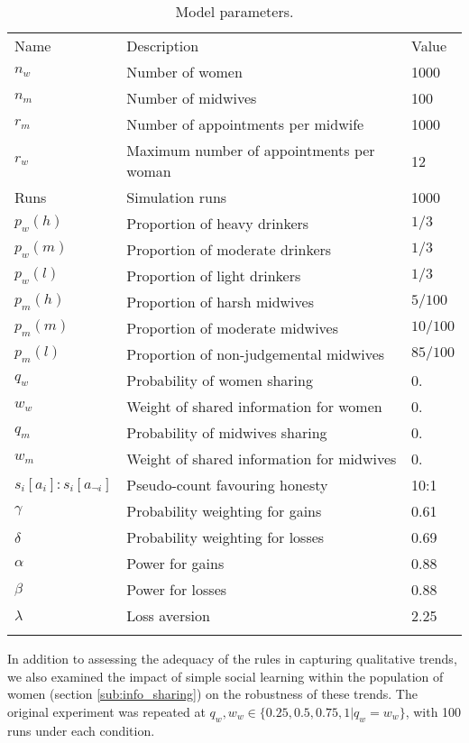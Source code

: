 \begin{table}[h!]
\caption{Model parameters.} 
\label{tab:qt_params}
\begin{tabular} {lll}
\hline\noalign{\smallskip}
Name & Description & Value \\
\noalign{\smallskip}\svhline\noalign{\smallskip}
\(n_{w}\) & Number of women & 1000 \\ 
\(n_{m}\) & Number of midwives & 100 \\ 
\(r_{m}\) & Number of appointments per midwife & 1000 \\ 
\(r_{w}\) & Maximum number of appointments per woman & 12 \\ 
Runs & Simulation runs & 1000 \\ 
\(p_{w}(h)\) & Proportion of heavy drinkers & \(1/3\) \\ 
\(p_{w}(m)\) & Proportion of moderate drinkers & \(1/3\) \\ 
\(p_{w}(l)\) & Proportion of light drinkers & \(1/3\) \\ 
\(p_{m}(h)\) & Proportion of harsh midwives & \(5/100\) \\ 
\(p_{m}(m)\) & Proportion of moderate midwives & \(10/100\) \\ 
\(p_{m}(l)\) & Proportion of non-judgemental midwives & \(85/100\) \\ 
\(q_{w}\) & Probability of women sharing & 0. \\ 
\(w_{w}\) & Weight of shared information for women & 0. \\ 
\(q_{m}\) & Probability of midwives sharing & 0. \\ 
\(w_{m}\) & Weight of shared information for midwives & 0. \\ 
\(s_{i}[a_{i}]:s_{i}[a_{\neg i}]\) & Pseudo-count favouring honesty & 10:1 \\ 
\(\gamma\) & Probability weighting for gains  & 0.61 \\ 
\(\delta\) & Probability weighting for losses &  0.69\\ 
\(\alpha\) & Power for gains  & 0.88 \\ 
\(\beta\) & Power for losses & 0.88 \\ 
\(\lambda\) & Loss aversion &  2.25 \\
\noalign{\smallskip}\hline\noalign{\smallskip}
\end{tabular}
\end{table}


In addition to assessing the adequacy of the rules in capturing qualitative trends, we also examined the impact of simple social learning within the population of women (section \ref{sub:info_sharing}) on the robustness of these trends. The original experiment was repeated at \(q_{w},w_{w}\in \{0.25, 0.5, 0.75, 1 | q_{w}=w_{w}\}\), with 100 runs under each condition. 


